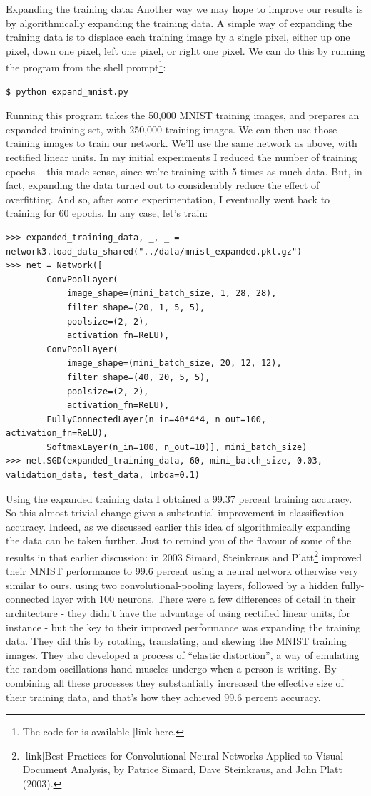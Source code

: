 \documentclass[a4paper,twoside,10pt]{book}
\begin{document}
Expanding the training data: Another way we may hope to improve our results is by algorithmically expanding the training data. A simple way of expanding the training data is to displace each training image by a single pixel, either up one pixel, down one pixel, left one pixel, or right one pixel. We can do this by running the program  from the shell prompt\footnote{The code for  is available [link]here.}:
\begin{lstlisting}
$ python expand_mnist.py
\end{lstlisting}
Running this program takes the 50,000 MNIST training images, and prepares an expanded training set, with 250,000 training images. We can then use those training images to train our network. We'll use the same network as above, with rectified linear units. In my initial experiments I reduced the number of training epochs -- this made sense, since we're training with 5 times as much data. But, in fact, expanding the data turned out to considerably reduce the effect of overfitting. And so, after some experimentation, I eventually went back to training for 60 epochs. In any case, let's train:

\begin{lstlisting}
>>> expanded_training_data, _, _ = network3.load_data_shared("../data/mnist_expanded.pkl.gz")
>>> net = Network([
		ConvPoolLayer(
			image_shape=(mini_batch_size, 1, 28, 28),
			filter_shape=(20, 1, 5, 5), 
			poolsize=(2, 2), 
			activation_fn=ReLU),
		ConvPoolLayer(
			image_shape=(mini_batch_size, 20, 12, 12),
			filter_shape=(40, 20, 5, 5), 
			poolsize=(2, 2),
			activation_fn=ReLU),
		FullyConnectedLayer(n_in=40*4*4, n_out=100, activation_fn=ReLU),
		SoftmaxLayer(n_in=100, n_out=10)], mini_batch_size)
>>> net.SGD(expanded_training_data, 60, mini_batch_size, 0.03, validation_data, test_data, lmbda=0.1)
\end{lstlisting}
Using the expanded training data I obtained a 99.37 percent training accuracy. So this almost trivial change gives a substantial improvement in classification accuracy. Indeed, as we discussed earlier this idea of algorithmically expanding the data can be taken further. Just to remind you of the flavour of some of the results in that earlier discussion: in 2003 Simard, Steinkraus and Platt\footnote{[link]Best Practices for Convolutional Neural Networks Applied to Visual Document Analysis, by Patrice Simard, Dave Steinkraus, and John Platt (2003).} improved their MNIST performance to 99.6 percent using a neural network otherwise very similar to ours, using two convolutional-pooling layers, followed by a hidden fully-connected layer with 100 neurons. There were a few differences of detail in their architecture - they didn't have the advantage of using rectified linear units, for instance - but the key to their improved performance was expanding the training data. They did this by rotating, translating, and skewing the MNIST training images. They also developed a process of ``elastic distortion'', a way of emulating the random oscillations hand muscles undergo when a person is writing. By combining all these processes they substantially increased the effective size of their training data, and that's how they achieved 99.6 percent accuracy.
\end{document}
